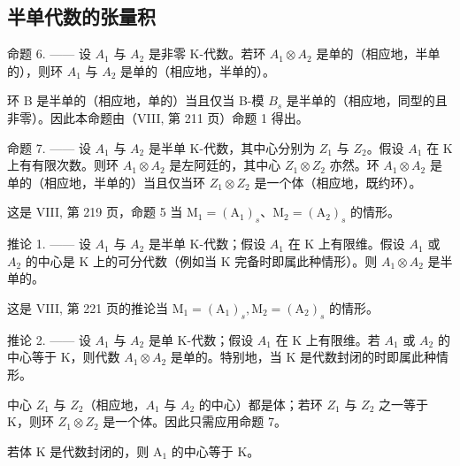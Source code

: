 \subsection{半单代数的张量积}

命题 6. —— 设 \(A_{1}\) 与 \(A_{2}\) 是非零 K-代数。若环 \(A_{1} \otimes A_{2}\) 是单的（相应地，半单的），则环 \(A_{1}\) 与 \(A_{2}\) 是单的（相应地，半单的）。

环 B 是半单的（相应地，单的）当且仅当 B-模 \(B_{s}\) 是半单的（相应地，同型的且非零）。因此本命题由（VIII, 第 211 页）命题 1 得出。

命题 7. —— 设 \(A_{1}\) 与 \(A_{2}\) 是半单 K-代数，其中心分别为 \(Z_{1}\) 与 \(Z_{2}\)。假设 \(A_{1}\) 在 K 上有有限次数。则环 \(A_{1} \otimes A_{2}\) 是左阿廷的，其中心 \(Z_{1} \otimes Z_{2}\) 亦然。环 \(A_{1} \otimes A_{2}\) 是单的（相应地，半单的）当且仅当环 \(Z_{1} \otimes Z_{2}\) 是一个体（相应地，既约环）。

这是 VIII, 第 219 页，命题 5 当 \(\mathrm{M}_1 = (\mathrm{A}_1)_s\)、\(\mathrm{M}_2 = (\mathrm{A}_2)_s\) 的情形。

推论 1. —— 设 \(A_{1}\) 与 \(A_{2}\) 是半单 K-代数；假设 \(A_{1}\) 在 K 上有限维。假设 \(A_{1}\) 或 \(A_{2}\) 的中心是 K 上的可分代数（例如当 K 完备时即属此种情形）。则 \(A_{1} \otimes A_{2}\) 是半单的。

这是 VIII, 第 221 页的推论当 \(\mathrm{M}_{1}=(\mathrm{A}_{1})_{s},\mathrm{M}_{2}=(\mathrm{A}_{2})_{s}\) 的情形。

推论 2. —— 设 \(A_{1}\) 与 \(A_{2}\) 是单 K-代数；假设 \(A_{1}\) 在 K 上有限维。若 \(A_{1}\) 或 \(A_{2}\) 的中心等于 K，则代数 \(A_{1} \otimes A_{2}\) 是单的。特别地，当 K 是代数封闭的时即属此种情形。

中心 \(Z_{1}\) 与 \(Z_{2}\)（相应地，\(A_{1}\) 与 \(A_{2}\) 的中心）都是体；若环 \(Z_{1}\) 与 \(Z_{2}\) 之一等于 K，则环 \(Z_{1} \otimes Z_{2}\) 是一个体。因此只需应用命题 7。

若体 \(\mathrm{K}\) 是代数封闭的，则 \(\mathrm{A}_1\) 的中心等于 \(\mathrm{K}\)。
\relax{}
